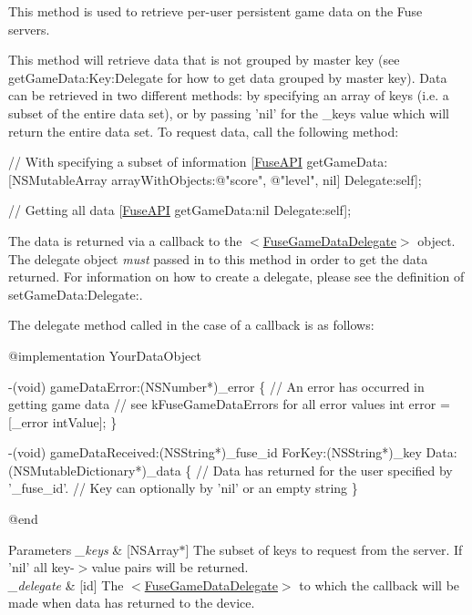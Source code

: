 This method is used to retrieve per-\/user persistent game data on the Fuse servers. 

This method will retrieve data that is not grouped by master key (see get\+Game\+Data\+:\+Key\+:Delegate for how to get data grouped by master key). Data can be retrieved in two different methods\+: by specifying an array of keys (i.\+e. a subset of the entire data set), or by passing 'nil' for the \+\_\+keys value which will return the entire data set. To request data, call the following method\+:


\begin{DoxyCode}
\textcolor{comment}{// With specifying a subset of information}
[\hyperlink{interface_fuse_a_p_i}{FuseAPI} getGameData:[NSMutableArray arrayWithObjects:\textcolor{stringliteral}{@"score"}, \textcolor{stringliteral}{@"level"}, nil] Delegate:\textcolor{keyword}{self}]; 

\textcolor{comment}{// Getting all data}
[\hyperlink{interface_fuse_a_p_i}{FuseAPI} getGameData:nil Delegate:\textcolor{keyword}{self}]; 
\end{DoxyCode}


The data is returned via a callback to the $<$\hyperlink{protocol_fuse_game_data_delegate-p}{Fuse\+Game\+Data\+Delegate}$>$ object. The delegate object {\itshape must} passed in to this method in order to get the data returned. For information on how to create a delegate, please see the definition of set\+Game\+Data\+:\+Delegate\+:.

The delegate method called in the case of a callback is as follows\+:


\begin{DoxyCode}
\textcolor{keyword}{@implementation }YourDataObject

-(void) gameDataError:(NSNumber*)\_error
\{
   \textcolor{comment}{// An error has occurred in getting game data}
   \textcolor{comment}{// see kFuseGameDataErrors for all error values}
   \textcolor{keywordtype}{int} error = [\_error intValue];
\}

-(void) gameDataReceived:(NSString*)\_fuse\_id ForKey:(NSString*)\_key Data:(NSMutableDictionary*)\_data
\{
   \textcolor{comment}{// Data has returned for the user specified by '\_fuse\_id'.}
   \textcolor{comment}{// Key can optionally by 'nil' or an empty string}
\}

\textcolor{keyword}{@end}
\end{DoxyCode}



\begin{DoxyParams}{Parameters}
{\em \+\_\+keys} & \mbox{[}N\+S\+Array$\ast$\mbox{]} The subset of keys to request from the server. If 'nil' all key-\/$>$value pairs will be returned. \\
\hline
{\em \+\_\+delegate} & \mbox{[}id\mbox{]} The $<$\hyperlink{protocol_fuse_game_data_delegate-p}{Fuse\+Game\+Data\+Delegate}$>$ to which the callback will be made when data has returned to the device. \\
\hline
\end{DoxyParams}

